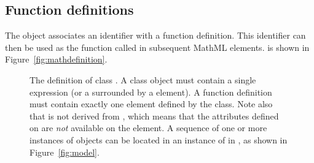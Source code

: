 \subsection{Function definitions}
\label{sec:functiondefinition}

The \FunctionDefinition object associates an identifier with a
function definition.  This identifier can then be used as the
function called in subsequent MathML  elements.
\FunctionDefinition is shown in Figure~\ref{fig:mathdefinition}.

\begin{figure}[htb]
  \centering
  \small
  \vspace*{-0.75ex}
  \vspace*{-2ex}
  \caption{The definition of class \FunctionDefinition.  A
     class object must contain a single \mathml
     expression (or a  surrounded by a
     element).  A function definition must
    contain exactly one  element defined by the
     class.  Note also that  is not
    derived from \SBase, which means that the attributes defined
    on \SBase are \emph{not} available on the 
    element.  A sequence of one or more instances of
    \FunctionDefinition objects can be located in an instance of
    \ListOfFunctionDefinitions in \Model, as shown in
    Figure~\protect\ref{fig:model}.}
  \label{fig:mathdefinition}
  \label{fig:functionDefinition}
\end{figure}

